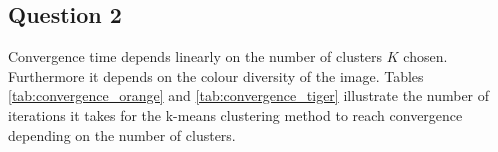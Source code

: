 \subsection{Question 2}
Convergence time depends linearly on the number of clusters $K$ chosen.
Furthermore it depends on the colour diversity of the image.
Tables \ref{tab:convergence_orange} and \ref{tab:convergence_tiger} illustrate
the number of iterations it takes for the k-means clustering method to
reach convergence depending on the number of clusters.

\begin{table}[H]
\centering
{}
\end{table}
